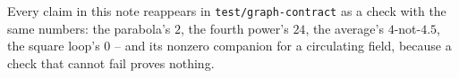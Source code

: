 \documentclass[11pt]{article}
\begin{document}
\bigskip
\noindent
Every claim in this note reappears in \texttt{test/graph-contract} as
a check with the same numbers: the parabola's $2$, the fourth power's
$24$, the average's $4$-not-$4.5$, the square loop's $0$ -- and its
nonzero companion for a circulating field, because a check that
cannot fail proves nothing.
\end{document}
